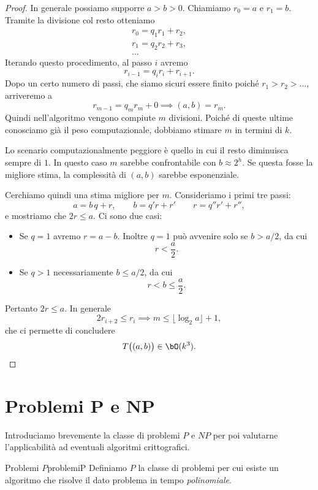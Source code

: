	\begin{proof}
	In generale possiamo supporre \(a>b>0\).
	Chiamiamo \(r_0=a\) e \(r_1=b\). Tramite la divisione col resto otteniamo
		\begin{gather*}
		r_0 = q_1 r_1 + r_2,\\
		r_1 = q_2 r_2 + r_3,\\
		...
		\end{gather*}
	Iterando questo procedimento, al passo \(i\) avremo
		\[
		r_{i-1} = q_i r_i + r_{i+1}.
		\]
	Dopo un certo numero di passi, che siamo sicuri essere finito poiché \(r_1 > r_2 > \ldots\), arriveremo a
		\[
		r_{m-1} = q_m r_m + 0 \implies (a,b) = r_m.
		\]
	Quindi nell'algoritmo vengono compiute \(m\) divisioni.
	Poiché di queste ultime conosciamo già il peso computazionale, dobbiamo stimare \(m\) in termini di \(k\).

	Lo scenario computazionalmente peggiore è quello in cui il resto diminuisca sempre di \(1\).
	In questo caso \(m\) sarebbe confrontabile con \(b \approx 2^h\). Se questa fosse la migliore stima, la complessità di \((a,b)\) sarebbe esponenziale.
	
	Cerchiamo quindi una stima migliore per \(m\). Consideriamo i primi tre passi:
		\[
		a = b\,q + r, \qquad b = q'r + r' \qquad r = q'' r' + r'',
		\]
	e mostriamo che \(2r \le a\). Ci sono due casi:
	\begin{itemize}
		\item Se \(q=1\) avremo \(r= a-b\). Inoltre \(q=1\) può avvenire solo se \(b > a/2\), da cui
			\[
			r < \frac{a}{2}.
			\]
		\item Se \(q > 1\) necessariamente \(b \le a/2\), da cui
			\[
			r < b \le \frac{a}{2}.
			\]
	\end{itemize}
	Pertanto \(2r \le a\). In generale
		\[
		2 r_{i+2} \le r_i \implies m \le \lfloor \log_2 a \rfloor +1,
		\]
	che ci permette di concludere
		\[
		T\big((a,b)\big) \in \bO(k^3).\qedhere
		\]
	\end{proof}
%
%
\section{Problemi P e NP}

	Introduciamo brevemente la classe di problemi \(P\) e \(NP\) per poi valutarne l'applicabilità ad eventuali algoritmi crittografici.

	\begin{defn}{Problemi \(P\)}{problemiP}
	Definiamo \(P\) la classe di problemi per cui esiste un algoritmo che risolve il dato problema in tempo \emph{polinomiale}.
	\end{defn}

